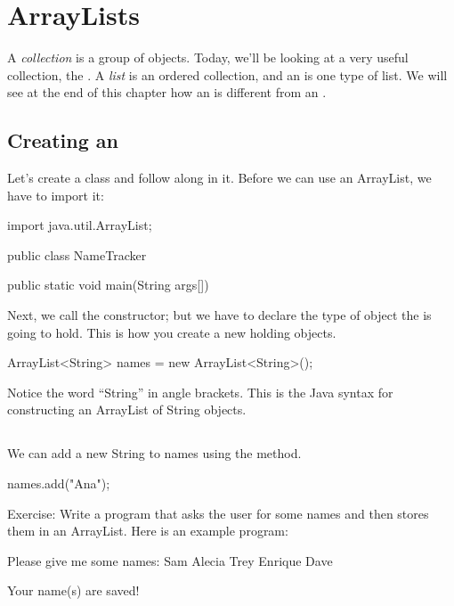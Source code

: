 \chapter{ArrayLists}

A \emph{collection} is a group of objects. Today, we'll be looking at a very useful collection, the . A \emph{list} is an ordered collection, and an  is one type of list. We will see at the end of this chapter how an  is different from an .

\section{Creating an }

Let's create a class  and follow along in it. Before we can use an ArrayList, we have to import it:

\begin{code}
import java.util.ArrayList;

public class NameTracker {
    
    public static void main(String args[]) {
    }
}
\end{code}

\noindent Next, we call the constructor; but we have to declare the type of object the  is going to hold. This is how you create a new  holding  objects.

\begin{code}
ArrayList<String> names = new ArrayList<String>();
\end{code}

\noindent Notice the word ``String'' in angle brackets. This is the Java syntax for constructing an ArrayList of String objects.

\section{}

We can add a new String to names using the  method.

\begin{code}
names.add("Ana");
\end{code}

\begin{example}
Exercise: Write a program that asks the user for some names and then stores them in an ArrayList. Here is an example program:

\begin{monospace}
Please give me some names:
Sam
Alecia
Trey
Enrique
Dave

Your name(s) are saved!
\end{monospace}
\end{example}

